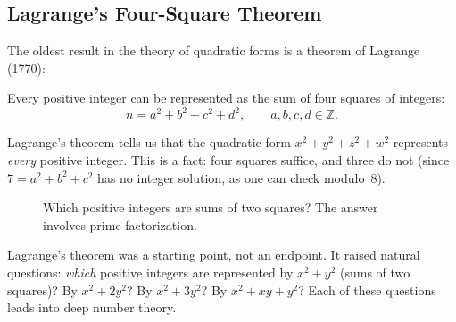 \subsection{Lagrange's Four-Square Theorem}

The oldest result in the theory of quadratic forms is a theorem of Lagrange (1770):

\begin{theorem}[Lagrange]\label{thm:lagrange-four-squares}
Every positive integer can be represented as the sum of four squares of integers:
\[
    n = a^2 + b^2 + c^2 + d^2, \qquad a, b, c, d \in \mathbb{Z}.
\]
\end{theorem}

Lagrange's theorem tells us that the quadratic form $x^2 + y^2 + z^2 + w^2$ represents \emph{every} positive integer. This is a fact: four squares suffice, and three do not (since $7 = a^2 + b^2 + c^2$ has no integer solution, as one can check modulo~8).

\begin{figure}[htbp]
\centering
{}
\caption{Which positive integers are sums of two squares? The answer involves prime factorization.}
\label{fig:sums-of-squares}
\end{figure}

Lagrange's theorem was a starting point, not an endpoint. It raised natural questions: \emph{which} positive integers are represented by $x^2 + y^2$ (sums of two squares)? By $x^2 + 2y^2$? By $x^2 + 3y^2$? By $x^2 + xy + y^2$? Each of these questions leads into deep number theory.

